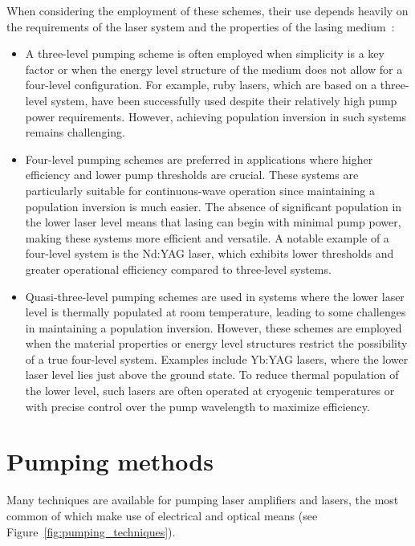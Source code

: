 \documentclass[prl,twocolumn]{revtex4-1}
\begin{document}
When considering the employment of these schemes, their use depends heavily on the requirements of the laser system and the properties of the lasing medium~\cite{Milonni2010}:

\begin{itemize}
    \item A three-level pumping scheme is often employed when simplicity is a key factor or when the energy level structure of the medium does not allow for a four-level configuration. For example, ruby lasers, which are based on a three-level system, have been successfully used despite their relatively high pump power requirements. However, achieving population inversion in such systems remains challenging.
    
    \item Four-level pumping schemes are preferred in applications where higher efficiency and lower pump thresholds are crucial. These systems are particularly suitable for continuous-wave operation since maintaining a population inversion is much easier. The absence of significant population in the lower laser level means that lasing can begin with minimal pump power, making these systems more efficient and versatile. A notable example of a four-level system is the Nd:YAG laser, which exhibits lower thresholds and greater operational efficiency compared to three-level systems.
    
    \item Quasi-three-level pumping schemes are used in systems where the lower laser level is thermally populated at room temperature, leading to some challenges in maintaining a population inversion. However, these schemes are employed when the material properties or energy level structures restrict the possibility of a true four-level system. Examples include Yb:YAG lasers, where the lower laser level lies just above the ground state. To reduce thermal population of the lower level, such lasers are often operated at cryogenic temperatures or with precise control over the pump wavelength to maximize efficiency.
\end{itemize}

\section{Pumping methods}
Many techniques are available for pumping laser amplifiers and lasers, the
most common of which make use of electrical and optical means (see Figure~\ref{fig:pumping_techniques}).
\end{document}
